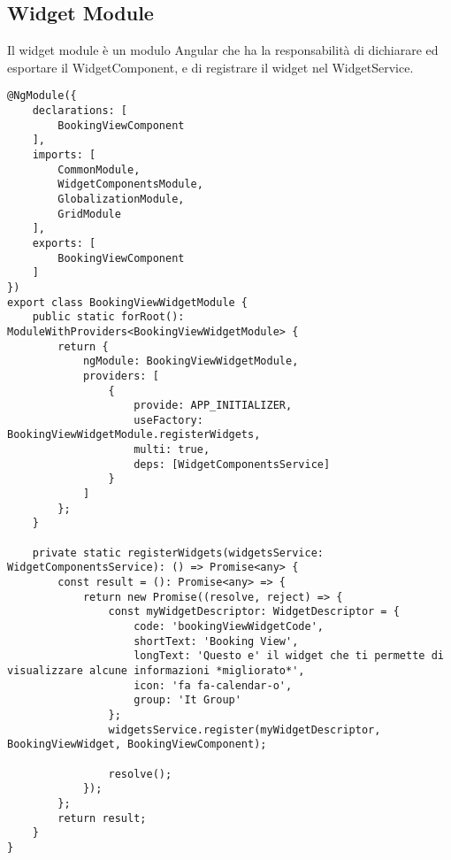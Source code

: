 \subsection{Widget Module}
Il widget module è un modulo Angular che ha la responsabilità di dichiarare ed esportare il WidgetComponent, e di registrare il widget nel WidgetService.
\begin{lstlisting}[caption={booking-view-widget.module.ts},label={booking_view_widget_module},style=javascriptCode]
@NgModule({
    declarations: [
        BookingViewComponent
    ],
    imports: [
        CommonModule,
        WidgetComponentsModule,
        GlobalizationModule,
        GridModule
    ],
    exports: [
        BookingViewComponent
    ]
})
export class BookingViewWidgetModule {
    public static forRoot(): ModuleWithProviders<BookingViewWidgetModule> {
        return {
            ngModule: BookingViewWidgetModule,
            providers: [
                {
                    provide: APP_INITIALIZER,
                    useFactory: BookingViewWidgetModule.registerWidgets,
                    multi: true,
                    deps: [WidgetComponentsService]
                }
            ]
        };
    }

    private static registerWidgets(widgetsService: WidgetComponentsService): () => Promise<any> {
        const result = (): Promise<any> => {
            return new Promise((resolve, reject) => {
                const myWidgetDescriptor: WidgetDescriptor = {
                    code: 'bookingViewWidgetCode',
                    shortText: 'Booking View',
                    longText: 'Questo e' il widget che ti permette di visualizzare alcune informazioni *migliorato*',
                    icon: 'fa fa-calendar-o',
                    group: 'It Group'
                };
                widgetsService.register(myWidgetDescriptor, BookingViewWidget, BookingViewComponent);

                resolve();
            });
        };
        return result;
    }
}
\end{lstlisting}

